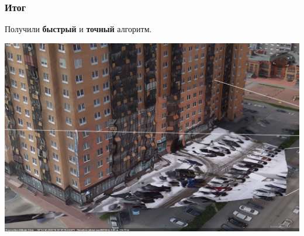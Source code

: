 \documentclass{beamer}
\begin{document}
\begin{frame}
\frametitle{Итог}
	\centerline{Получили \textbf{быстрый} и \textbf{точный} алгоритм.}
	
	\centerline{\includegraphics[scale=0.26]{sample.png}}
\end{frame}

\end{document}
